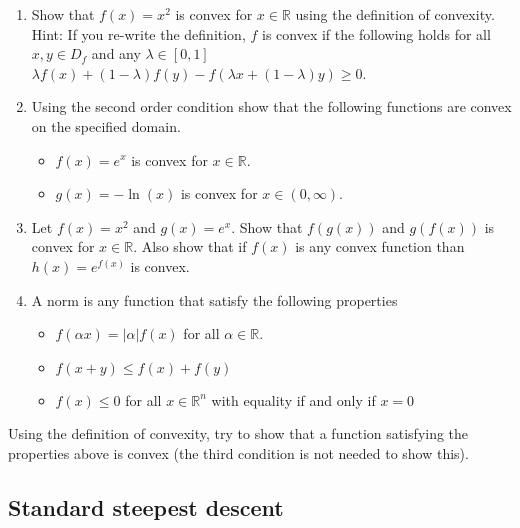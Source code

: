 \documentclass[%
oneside,                 %
final,                   %
10pt]{article}
\begin{document}
\begin{enumerate}
\item Show that $f(x)=x^2$ is convex for $x \in \mathbb{R}$ using the definition of convexity. Hint: If you re-write the definition, $f$ is convex if the following holds for all $x,y \in D_f$ and any $\lambda \in [0,1]$ $\lambda f(x)+(1-\lambda)f(y)-f(\lambda x + (1-\lambda) y ) \geq 0$.

\item Using the second order condition show that the following functions are convex on the specified domain.
\begin{itemize}

 \item $f(x) = e^x$ is convex for $x \in \mathbb{R}$.

 \item $g(x) = -\ln(x)$ is convex for $x \in (0,\infty)$.

\end{itemize}

\noindent
\item Let $f(x) = x^2$ and $g(x) = e^x$. Show that $f(g(x))$ and $g(f(x))$ is convex for $x \in \mathbb{R}$. Also show that if $f(x)$ is any convex function than $h(x) = e^{f(x)}$ is convex.

\item A norm is any function that satisfy the following properties
\begin{itemize}

 \item $f(\alpha x) = |\alpha| f(x)$ for all $\alpha \in \mathbb{R}$.

 \item $f(x+y) \leq f(x) + f(y)$

 \item $f(x) \leq 0$ for all $x \in \mathbb{R}^n$ with equality if and only if $x = 0$
\end{itemize}

\noindent
\end{enumerate}

\noindent
Using the definition of convexity, try to show that a function satisfying the properties above is convex (the third condition is not needed to show this).



\subsection*{Standard steepest descent}
\end{document}
